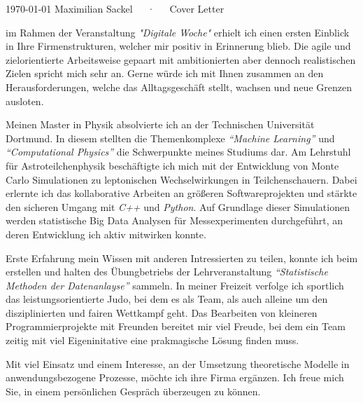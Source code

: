 \documentclass[11pt, a4paper]{Awesome-CV/awesome-cv}
\begin{document}
\makecvheader[R]

\makecvfooter
{\today}
{Maximilian Sackel~~~·~~~Cover Letter}
{}

\makelettertitle

\begin{cvletter}
    im Rahmen der Veranstaltung \textit{"Digitale Woche"} erhielt ich einen ersten Einblick in Ihre Firmenstrukturen,
    welcher mir positiv in Erinnerung blieb.
    Die agile und zielorientierte Arbeitsweise gepaart mit ambitionierten aber
    dennoch realistischen Zielen spricht mich sehr an.
    Gerne würde ich mit Ihnen zusammen an den Herausforderungen,
    welche das Alltagsgeschäft stellt,
    wachsen und neue Grenzen ausloten.

    Meinen Master in Physik absolvierte ich an der Technischen Universität Dortmund.
    In diesem stellten die Themenkomplexe \textit{``Machine Learning''}
    und \textit{``Computational Physics''} die Schwerpunkte meines Studiums dar.
    Am Lehrstuhl für Astroteilchenphysik beschäftigte ich mich
    mit der Entwicklung von Monte Carlo Simulationen zu leptonischen Wechselwirkungen
    in Teilchenschauern.
    Dabei erlernte ich das kollaborative Arbeiten an größeren Softwareprojekten
    und stärkte den sicheren Umgang mit \textit{C++} und \textit{Python}.
    Auf Grundlage dieser Simulationen werden statistische Big Data Analysen für Messexperimenten durchgeführt,
    an deren Entwicklung ich aktiv mitwirken konnte.

    Erste Erfahrung mein Wissen mit anderen Intressierten zu teilen,
    konnte ich beim erstellen und halten des Übungbetriebs der Lehrveranstaltung
    \textit{``Statistische Methoden der Datenanlayse''} sammeln.
    In meiner Freizeit verfolge ich sportlich das leistungsorientierte Judo,
    bei dem es als Team, als auch alleine um den disziplinierten und fairen
    Wettkampf geht.
    Das Bearbeiten von kleineren Programmierprojekte mit Freunden bereitet mir viel Freude,
    bei dem ein Team zeitig mit viel Eigeninitative eine prakmagische Lösung finden muss.

    Mit viel Einsatz und einem Interesse,
    an der Umsetzung theoretische Modelle in anwendungsbezogene Prozesse,
    möchte ich ihre Firma ergänzen.
    Ich freue mich Sie, in einem persönlichen Gespräch überzeugen zu können.

\end{cvletter}


\makeletterclosing
\end{document}
